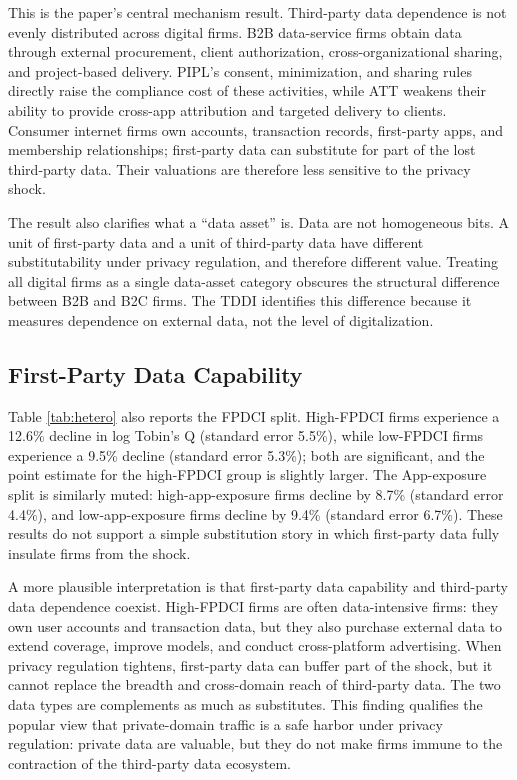 This is the paper's central mechanism result. Third-party data dependence is not evenly distributed across digital firms. B2B data-service firms obtain data through external procurement, client authorization, cross-organizational sharing, and project-based delivery. PIPL's consent, minimization, and sharing rules directly raise the compliance cost of these activities, while ATT weakens their ability to provide cross-app attribution and targeted delivery to clients. Consumer internet firms own accounts, transaction records, first-party apps, and membership relationships; first-party data can substitute for part of the lost third-party data. Their valuations are therefore less sensitive to the privacy shock.

The result also clarifies what a ``data asset'' is. Data are not homogeneous bits. A unit of first-party data and a unit of third-party data have different substitutability under privacy regulation, and therefore different value. Treating all digital firms as a single data-asset category obscures the structural difference between B2B and B2C firms. The TDDI identifies this difference because it measures dependence on external data, not the level of digitalization.

\subsection{First-Party Data Capability}

Table \ref{tab:hetero} also reports the FPDCI split. High-FPDCI firms experience a 12.6\% decline in log Tobin's Q (standard error 5.5\%), while low-FPDCI firms experience a 9.5\% decline (standard error 5.3\%); both are significant, and the point estimate for the high-FPDCI group is slightly larger. The App-exposure split is similarly muted: high-app-exposure firms decline by 8.7\% (standard error 4.4\%), and low-app-exposure firms decline by 9.4\% (standard error 6.7\%). These results do not support a simple substitution story in which first-party data fully insulate firms from the shock.

A more plausible interpretation is that first-party data capability and third-party data dependence coexist. High-FPDCI firms are often data-intensive firms: they own user accounts and transaction data, but they also purchase external data to extend coverage, improve models, and conduct cross-platform advertising. When privacy regulation tightens, first-party data can buffer part of the shock, but it cannot replace the breadth and cross-domain reach of third-party data. The two data types are complements as much as substitutes. This finding qualifies the popular view that private-domain traffic is a safe harbor under privacy regulation: private data are valuable, but they do not make firms immune to the contraction of the third-party data ecosystem.

